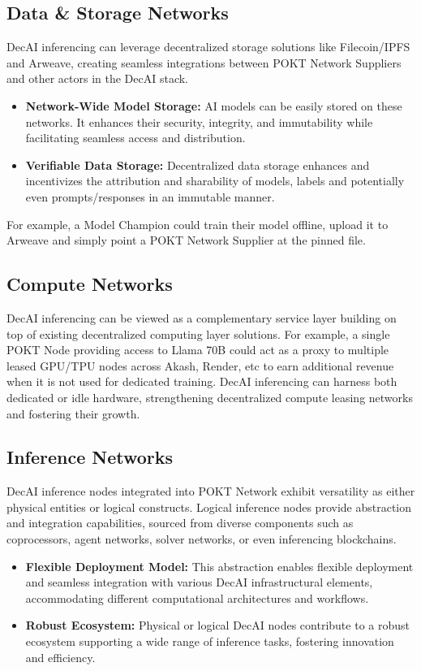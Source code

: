 \documentclass[conference,compsoc]{IEEEtran}
\begin{document}
\subsection{Data \& Storage Networks}
DecAI inferencing can leverage decentralized storage solutions like Filecoin/IPFS and Arweave, creating seamless integrations between POKT Network Suppliers and other actors in the DecAI stack.

\begin{itemize}
    \item \textbf{Network-Wide Model Storage:} AI models can be easily stored on these networks. It enhances their security, integrity, and immutability while facilitating seamless access and distribution.

    \item \textbf{Verifiable Data Storage:} Decentralized data storage enhances and incentivizes the attribution and sharability of models, labels and potentially even prompts/responses in an immutable manner.

\end{itemize}
For example, a Model Champion could train their model offline, upload it to Arweave and simply point a POKT Network Supplier at the pinned file.


\subsection{Compute Networks}
DecAI inferencing can be viewed as a complementary service layer building on top of existing decentralized computing layer solutions. For example, a single POKT Node providing access to Llama 70B could act as a proxy to multiple leased GPU/TPU nodes across Akash, Render, etc to earn additional revenue when it is not used for dedicated training. DecAI inferencing can harness both dedicated or idle hardware, strengthening decentralized compute leasing networks and fostering their growth.

\subsection{Inference Networks}
DecAI inference nodes integrated into POKT Network exhibit versatility as either physical entities or logical constructs. Logical inference nodes provide abstraction and integration capabilities, sourced from diverse components such as coprocessors, agent networks, solver networks, or even inferencing blockchains.

\begin{itemize}
    \item \textbf{Flexible Deployment Model:} This abstraction enables flexible deployment and seamless integration with various DecAI infrastructural elements, accommodating different computational architectures and workflows.

    \item \textbf{Robust Ecosystem:} Physical or logical DecAI nodes contribute to a robust ecosystem supporting a wide range of inference tasks, fostering innovation and efficiency.

\end{itemize}
\end{document}

